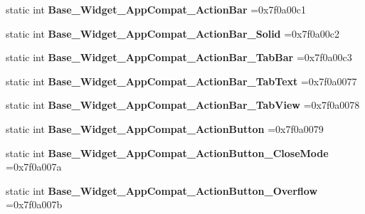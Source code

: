 \begin{DoxyCompactItemize}
static int {\bfseries Base\+\_\+\+Widget\+\_\+\+App\+Compat\+\_\+\+Action\+Bar} =0x7f0a00c1
\item 
\mbox{\label{classandroid_1_1support_1_1v4_1_1R_1_1style_a8d39cae793800ed2b6672070dd13232c}} 
static int {\bfseries Base\+\_\+\+Widget\+\_\+\+App\+Compat\+\_\+\+Action\+Bar\+\_\+\+Solid} =0x7f0a00c2
\item 
\mbox{\label{classandroid_1_1support_1_1v4_1_1R_1_1style_ae4150f61fadaa8b1cb9162349d9e8cf2}} 
static int {\bfseries Base\+\_\+\+Widget\+\_\+\+App\+Compat\+\_\+\+Action\+Bar\+\_\+\+Tab\+Bar} =0x7f0a00c3
\item 
\mbox{\label{classandroid_1_1support_1_1v4_1_1R_1_1style_a1aa043b1df65e0020200ca2110410c37}} 
static int {\bfseries Base\+\_\+\+Widget\+\_\+\+App\+Compat\+\_\+\+Action\+Bar\+\_\+\+Tab\+Text} =0x7f0a0077
\item 
\mbox{\label{classandroid_1_1support_1_1v4_1_1R_1_1style_ad842008e290071b1f1e1ebba744d277e}} 
static int {\bfseries Base\+\_\+\+Widget\+\_\+\+App\+Compat\+\_\+\+Action\+Bar\+\_\+\+Tab\+View} =0x7f0a0078
\item 
\mbox{\label{classandroid_1_1support_1_1v4_1_1R_1_1style_a37bb07f51c0df9f298b5a61e67022e79}} 
static int {\bfseries Base\+\_\+\+Widget\+\_\+\+App\+Compat\+\_\+\+Action\+Button} =0x7f0a0079
\item 
\mbox{\label{classandroid_1_1support_1_1v4_1_1R_1_1style_a3ee3e0536fb0b259b642c3fe3c654dff}} 
static int {\bfseries Base\+\_\+\+Widget\+\_\+\+App\+Compat\+\_\+\+Action\+Button\+\_\+\+Close\+Mode} =0x7f0a007a
\item 
\mbox{\label{classandroid_1_1support_1_1v4_1_1R_1_1style_a7796310b73cf22afe74511a748a898d0}} 
static int {\bfseries Base\+\_\+\+Widget\+\_\+\+App\+Compat\+\_\+\+Action\+Button\+\_\+\+Overflow} =0x7f0a007b
\item 
\mbox{\label{classandroid_1_1support_1_1v4_1_1R_1_1style_a1a492b1ef9c355221fbeb7581424f520}} 

\end{DoxyCompactItemize}
